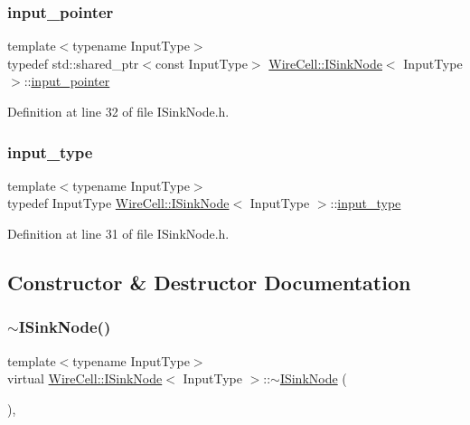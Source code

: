 \subsubsection{\texorpdfstring{input\+\_\+pointer}{input\_pointer}}
{\footnotesize\ttfamily template$<$typename Input\+Type$>$ \\
typedef std\+::shared\+\_\+ptr$<$const Input\+Type$>$ \hyperlink{class_wire_cell_1_1_i_sink_node}{Wire\+Cell\+::\+I\+Sink\+Node}$<$ Input\+Type $>$\+::\hyperlink{class_wire_cell_1_1_i_sink_node_abec1b6fe3da78c63bbc88c4f3f805d91}{input\+\_\+pointer}}



Definition at line 32 of file I\+Sink\+Node.\+h.

\mbox{\label{class_wire_cell_1_1_i_sink_node_ade16aea6fe9b56ab637b22db5eb15721}} 
\subsubsection{\texorpdfstring{input\+\_\+type}{input\_type}}
{\footnotesize\ttfamily template$<$typename Input\+Type$>$ \\
typedef Input\+Type \hyperlink{class_wire_cell_1_1_i_sink_node}{Wire\+Cell\+::\+I\+Sink\+Node}$<$ Input\+Type $>$\+::\hyperlink{class_wire_cell_1_1_i_sink_node_ade16aea6fe9b56ab637b22db5eb15721}{input\+\_\+type}}



Definition at line 31 of file I\+Sink\+Node.\+h.



\subsection{Constructor \& Destructor Documentation}
\mbox{\label{class_wire_cell_1_1_i_sink_node_a8c3d9d4b70ebb58b99db52ae951c4f67}} 
\subsubsection{\texorpdfstring{$\sim$\+I\+Sink\+Node()}{~ISinkNode()}}
{\footnotesize\ttfamily template$<$typename Input\+Type$>$ \\
virtual \hyperlink{class_wire_cell_1_1_i_sink_node}{Wire\+Cell\+::\+I\+Sink\+Node}$<$ Input\+Type $>$\+::$\sim$\hyperlink{class_wire_cell_1_1_i_sink_node}{I\+Sink\+Node} (\begin{DoxyParamCaption}{ }\end{DoxyParamCaption})\hspace{0.3cm}{\ttfamily [inline]}, {\ttfamily [virtual]}}




